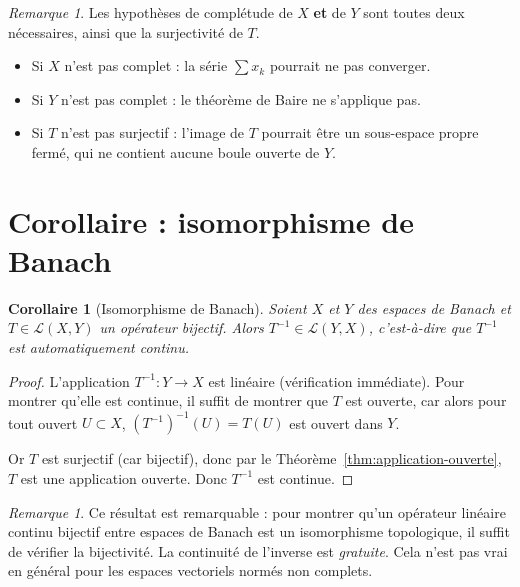 \documentclass[a4paper,12pt]{book}
\theoremstyle{definition}
\theoremstyle{plain}
\newtheorem{corollaire}[definition]{Corollaire}
\theoremstyle{remark}
\newtheorem{remarque}[definition]{Remarque}
\begin{document}
\begin{remarque}
\label{rem:app-ouverte-hypotheses}
Les hypothèses de complétude de $X$ \textbf{et} de $Y$ sont toutes
deux nécessaires, ainsi que la surjectivité de $T$.
\begin{itemize}
  \item Si $X$ n'est pas complet : la série $\sum x_k$ pourrait ne pas converger.
  \item Si $Y$ n'est pas complet : le théorème de Baire ne s'applique pas.
  \item Si $T$ n'est pas surjectif : l'image de $T$ pourrait être un
    sous-espace propre fermé, qui ne contient aucune boule ouverte de $Y$.
\end{itemize}
\end{remarque}


\section{Corollaire : isomorphisme de Banach}
\label{sec:isomorphisme-banach}


\begin{corollaire}[Isomorphisme de Banach]
\label{cor:isomorphisme-banach}
Soient $X$ et $Y$ des espaces de Banach et $T \in \mathcal{L}(X,Y)$
un opérateur bijectif. Alors $T^{-1} \in \mathcal{L}(Y,X)$, c'est-à-dire
que $T^{-1}$ est automatiquement continu.
\end{corollaire}

\begin{proof}
L'application $T^{-1} : Y \to X$ est linéaire (vérification immédiate).
Pour montrer qu'elle est continue, il suffit de montrer que $T$ est ouverte,
car alors pour tout ouvert $U \subset X$, $(T^{-1})^{-1}(U) = T(U)$ est
ouvert dans $Y$.

Or $T$ est surjectif (car bijectif), donc par le Théorème~\ref{thm:application-ouverte},
$T$ est une application ouverte. Donc $T^{-1}$ est continue.
\end{proof}

\begin{remarque}
\label{rem:iso-banach-important}
Ce résultat est remarquable : pour montrer qu'un opérateur linéaire continu
bijectif entre espaces de Banach est un isomorphisme topologique, il suffit
de vérifier la bijectivité. La continuité de l'inverse est \emph{gratuite}.
Cela n'est pas vrai en général pour les espaces vectoriels normés non complets.
\end{remarque}
\end{document}
